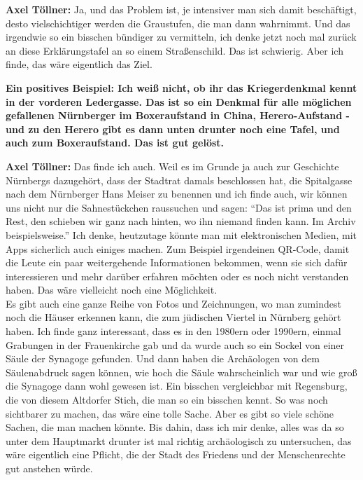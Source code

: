 \textbf{Axel Töllner:} Ja, und das Problem ist, je intensiver man sich damit beschäftigt, desto vielschichtiger werden die Graustufen, die man dann wahrnimmt. Und das irgendwie so ein bisschen bündiger zu vermitteln, ich denke jetzt noch mal zurück an diese Erklärungstafel an so einem Straßenschild. Das ist schwierig. Aber ich finde, das wäre eigentlich das Ziel. 

\textbf{Ein positives Beispiel: Ich weiß nicht, ob ihr das Kriegerdenkmal kennt in der vorderen Ledergasse. Das ist so ein Denkmal für alle möglichen gefallenen Nürnberger im Boxeraufstand in China, Herero-Aufstand - und zu den Herero gibt es dann unten drunter noch eine Tafel, und auch zum Boxeraufstand. Das ist gut gelöst.} 

\textbf{Axel Töllner:} Das finde ich auch. Weil es im Grunde ja auch zur Geschichte Nürnbergs dazugehört, dass der Stadtrat damals beschlossen hat, die Spitalgasse nach dem Nürnberger Hans Meiser zu benennen und ich finde auch, wir können uns nicht nur die Sahnestückchen raussuchen und sagen: "`Das ist prima und den Rest, den schieben wir ganz nach hinten, wo ihn niemand finden kann. Im Archiv beispielsweise."' Ich denke, heutzutage könnte man mit elektronischen Medien, mit Apps sicherlich auch einiges machen. Zum Beispiel irgendeinen QR-Code, damit die Leute ein paar weitergehende Informationen bekommen, wenn sie sich dafür interessieren und mehr darüber erfahren möchten oder es noch nicht verstanden haben. Das wäre vielleicht noch eine Möglichkeit. \\
Es gibt auch eine ganze Reihe von Fotos und Zeichnungen, wo man zumindest noch die Häuser erkennen kann, die zum jüdischen Viertel in Nürnberg gehört haben. Ich finde ganz interessant, dass es in den 1980ern oder 1990ern, einmal Grabungen in der Frauenkirche gab und da wurde auch so ein Sockel von einer Säule der Synagoge gefunden. Und dann haben die Archäologen von dem Säulenabdruck sagen können, wie hoch die Säule wahrscheinlich war und wie groß die Synagoge dann wohl gewesen ist. Ein bisschen vergleichbar mit Regensburg, die von diesem Altdorfer Stich, die man so ein bisschen kennt. So was noch sichtbarer zu machen, das wäre eine tolle Sache. Aber es gibt so viele schöne Sachen, die man machen könnte. Bis dahin, dass ich mir denke, alles was da so unter dem Hauptmarkt drunter ist mal richtig archäologisch zu untersuchen, das wäre eigentlich eine Pflicht, die der Stadt des Friedens und der Menschenrechte gut anstehen würde. 